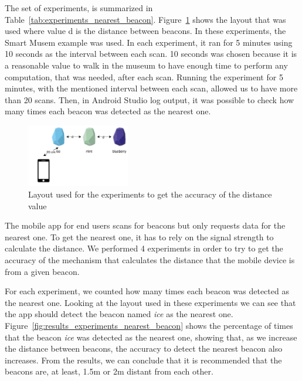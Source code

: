 The set of experiments, is summarized in Table~\ref{tab:experiments_nearest_beacon}.
Figure~\ref{fig:layout_experiments_nearest_beacon} shows the layout that was used where value d is the distance between beacons.
In these experiments, the Smart Musem example was used.
In each experiment, it ran for 5 minutes using 10 seconds as the interval between each scan.
10 seconds was chosen because it is a reasonable value to walk in the museum to have enough time to perform any computation, that was needed, after each scan.
Running the experiment for 5 minutes, with the mentioned interval between each scan, allowed us to have more than 20 scans.
Then, in Android Studio log output, it was possible to check how many times each beacon was detected as the nearest one.



\begin{figure}[!ht]
  \centering
    \includegraphics[width=0.4\textwidth, keepaspectratio]{figures/nearest_beacon}
    \caption[Layout for experiments of nearest beacon]{Layout used for the experiments to get the accuracy of the distance value}
    \label{fig:layout_experiments_nearest_beacon}
\end{figure}

The mobile app for end users scans for beacons but only requests data for the nearest one. To get the nearest one, it has to rely on the signal strength to calculate the distance. We performed 4 experiments in order to try to get the accuracy of the mechanism that calculates the distance that the mobile device is from a given beacon.

For each experiment, we counted how many times each beacon was detected as the nearest one.
Looking at the layout used in these experiments we can see that the app should detect the beacon named \emph{ice} as the nearest one.
Figure~\ref{fig:results_experiments_nearest_beacon} shows the percentage of times that the beacon \emph{ice} was detected as the nearest one, showing that, as we increase the distance between beacons, the accuracy to detect the nearest beacon also increases.
From the results, we can conclude that it is recommended that the beacons are, at least, 1.5m or 2m distant from each other.

